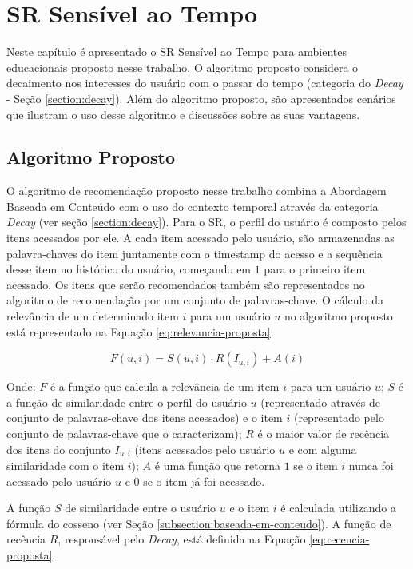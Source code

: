 \chapter{SR Sensível ao Tempo}\label{chapter:proposta}

Neste capítulo é apresentado o SR Sensível ao Tempo para ambientes educacionais proposto nesse trabalho. O algoritmo proposto
considera o decaimento nos interesses do usuário com o passar do tempo (categoria do \textit{Decay} - Seção \ref{section:decay}). Além
do algoritmo proposto, são apresentados cenários que ilustram o uso desse algoritmo e discussões sobre as suas vantagens.

\section{Algoritmo Proposto}\label{section:algoritmo-proposto}

O algoritmo de recomendação proposto nesse trabalho combina a Abordagem Baseada em Conteúdo com o uso do
contexto temporal através da categoria \textit{Decay} (ver seção \ref{section:decay}). Para o SR, o perfil do usuário é composto pelos
itens acessados por ele. A cada item acessado pelo usuário, são armazenadas as palavra-chaves
do item juntamente com o timestamp do acesso e a sequência desse item no histórico do usuário, começando em $1$ para o
primeiro item acessado. Os itens que serão recomendados também são representados no algoritmo de recomendação por um conjunto de palavras-chave. O cálculo da
relevância de um determinado item $i$ para um usuário $u$ no algoritmo proposto está representado na Equação \ref{eq:relevancia-proposta}.

\begin{equation}
  F(u,i) = S(u,i) \cdot R(I_{u,i}) + A(i)
  \label{eq:relevancia-proposta}
\end{equation}

Onde: $F$ é a função que calcula a relevância de um item $i$ para um usuário $u$; $S$ é a função de similaridade entre
o perfil do usuário $u$ (representado através de conjunto de palavras-chave dos itens acessados) e o item $i$
(representado pelo conjunto de palavras-chave que o caracterizam); $R$ é o maior valor de recência dos itens do conjunto
$I_{u,i}$ (itens acessados pelo usuário $u$ e com alguma similaridade com o item $i$); $A$ é uma função que retorna $1$
se o item $i$ nunca foi acessado pelo usuário $u$ e $0$ se o item já foi acessado.

A função $S$ de similaridade entre o usuário $u$ e o item $i$ é calculada utilizando a fórmula do cosseno (ver Seção
\ref{subsection:baseada-em-conteudo}). A função de recência $R$, responsável pelo \textit{Decay}, está definida na Equação
\ref{eq:recencia-proposta}.

